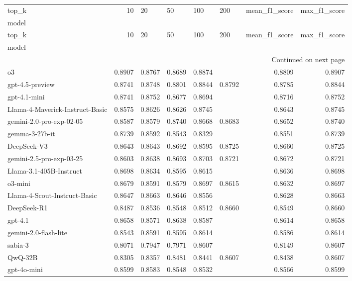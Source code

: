 \begin{longtable}{lrllllrr}
\toprule
top_k & 10 & 20 & 50 & 100 & 200 & mean_f1_score & max_f1_score \\
model &  &  &  &  &  &  &  \\
\midrule
\endfirsthead
\toprule
top_k & 10 & 20 & 50 & 100 & 200 & mean_f1_score & max_f1_score \\
model &  &  &  &  &  &  &  \\
\midrule
\endhead
\midrule
\multicolumn{8}{r}{Continued on next page} \\
\midrule
\endfoot
\bottomrule
\endlastfoot
o3 & 0.8907 & 0.8767 & 0.8689 & 0.8874 &  & 0.8809 & 0.8907 \\
gpt-4.5-preview & 0.8741 & 0.8748 & 0.8801 & 0.8844 & 0.8792 & 0.8785 & 0.8844 \\
gpt-4.1-mini & 0.8741 & 0.8752 & 0.8677 & 0.8694 &  & 0.8716 & 0.8752 \\
Llama-4-Maverick-Instruct-Basic & 0.8575 & 0.8626 & 0.8626 & 0.8745 &  & 0.8643 & 0.8745 \\
gemini-2.0-pro-exp-02-05 & 0.8587 & 0.8579 & 0.8740 & 0.8668 & 0.8683 & 0.8652 & 0.8740 \\
gemma-3-27b-it & 0.8739 & 0.8592 & 0.8543 & 0.8329 &  & 0.8551 & 0.8739 \\
DeepSeek-V3 & 0.8643 & 0.8643 & 0.8692 & 0.8595 & 0.8725 & 0.8660 & 0.8725 \\
gemini-2.5-pro-exp-03-25 & 0.8603 & 0.8638 & 0.8693 & 0.8703 & 0.8721 & 0.8672 & 0.8721 \\
Llama-3.1-405B-Instruct & 0.8698 & 0.8634 & 0.8595 & 0.8615 &  & 0.8636 & 0.8698 \\
o3-mini & 0.8679 & 0.8591 & 0.8579 & 0.8697 & 0.8615 & 0.8632 & 0.8697 \\
Llama-4-Scout-Instruct-Basic & 0.8647 & 0.8663 & 0.8646 & 0.8556 &  & 0.8628 & 0.8663 \\
DeepSeek-R1 & 0.8487 & 0.8536 & 0.8548 & 0.8512 & 0.8660 & 0.8549 & 0.8660 \\
gpt-4.1 & 0.8658 & 0.8571 & 0.8638 & 0.8587 &  & 0.8614 & 0.8658 \\
gemini-2.0-flash-lite & 0.8543 & 0.8591 & 0.8595 & 0.8614 &  & 0.8586 & 0.8614 \\
sabia-3 & 0.8071 & 0.7947 & 0.7971 & 0.8607 &  & 0.8149 & 0.8607 \\
QwQ-32B & 0.8305 & 0.8357 & 0.8481 & 0.8441 & 0.8607 & 0.8438 & 0.8607 \\
gpt-4o-mini & 0.8599 & 0.8583 & 0.8548 & 0.8532 &  & 0.8566 & 0.8599 \\

\end{longtable}
